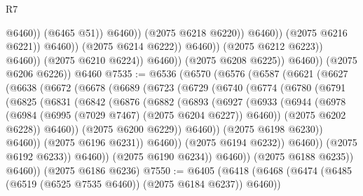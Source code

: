 \begin{lexlean}{R7}
\begin{coremodule}
                                                    @6460))
                                                (@6465 @51))
                                              @6460))
                                          (@2075 @6218 @6220))
                                        @6460))
                                    (@2075 @6216 @6221))
                                  @6460))
                              (@2075 @6214 @6222))
                            @6460))
                        (@2075 @6212 @6223))
                      @6460))
                  (@2075 @6210 @6224))
                @6460))
            (@2075 @6208 @6225))
          @6460))
      (@2075 @6206 @6226))
    @6460
@7535 := @6536
    (@6570
      (@6576
        (@6587
          (@6621
            (@6627
              (@6638
                (@6672
                  (@6678
                    (@6689
                      (@6723
                        (@6729
                          (@6740
                            (@6774
                              (@6780
                                (@6791
                                  (@6825
                                    (@6831
                                      (@6842
                                        (@6876
                                          (@6882
                                            (@6893
                                              (@6927
                                                (@6933
                                                  (@6944
                                                    (@6978
                                                      (@6984
                                                        (@6995 (@7029 @7467) (@2075 @6204 @6227))
                                                        @6460))
                                                    (@2075 @6202 @6228))
                                                  @6460))
                                              (@2075 @6200 @6229))
                                            @6460))
                                        (@2075 @6198 @6230))
                                      @6460))
                                  (@2075 @6196 @6231))
                                @6460))
                            (@2075 @6194 @6232))
                          @6460))
                      (@2075 @6192 @6233))
                    @6460))
                (@2075 @6190 @6234))
              @6460))
          (@2075 @6188 @6235))
        @6460))
    (@2075 @6186 @6236)
@7550 := @6405
    (@6418
      (@6468 (@6474 (@6485 (@6519 (@6525 @7535 @6460)) (@2075 @6184 @6237)) @6460))

\end{coremodule}
\end{lexlean}
